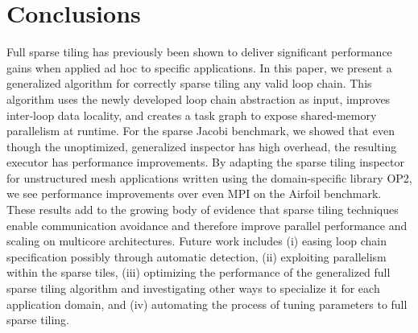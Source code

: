 


\section{Conclusions}
\label{sec:conclusions}

Full sparse tiling has previously been shown to deliver significant            
performance gains when applied ad hoc to specific applications. In              
this paper, we present a generalized algorithm for correctly sparse             
tiling any valid loop chain. This algorithm uses the newly developed            
loop chain abstraction as input, improves inter-loop data locality,             
and creates a task graph to expose shared-memory parallelism at                 
runtime. For the sparse Jacobi benchmark, we showed that even though            
the unoptimized, generalized inspector has high overhead, the                   
resulting executor has performance improvements. By adapting the                
sparse tiling inspector for unstructured mesh applications written              
using the domain-specific library OP2, we see performance improvements          
over even MPI on the Airfoil benchmark. These results add to the                
growing body of evidence that sparse tiling techniques enable                   
communication avoidance and therefore improve parallel performance and          
scaling on multicore architectures. Future work includes (i) easing             
loop chain specification possibly through automatic detection,          
(ii) exploiting parallelism within the sparse tiles, (iii)                 
optimizing the performance of the generalized full sparse tiling                
algorithm and investigating other ways to specialize it for each                
application domain, and (iv) automating the process of tuning                   
parameters to full sparse tiling.
